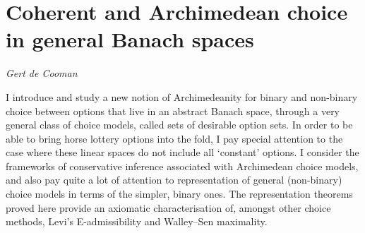 \documentclass[../booklet.tex]{subfiles}
\begin{document}
\section[Coherent and Archimedean choice in general Banach spaces. {\it Gert de Cooman}]{Coherent and Archimedean choice in general Banach spaces}

\begin{center}
  {\it Gert de Cooman}
\end{center}

\vskip 0.8cm


I introduce and study a new notion of Archimedeanity for binary and non-binary choice between options that live in an abstract Banach space, through a very general class of choice models, called sets of desirable option sets.
In order to be able to bring horse lottery options into the fold, I pay special attention to the case where these linear spaces do not include all `constant' options.
I consider the frameworks of conservative inference associated with Archimedean choice models, and also pay quite a lot of attention to representation of general (non-binary) choice models in terms of the simpler, binary ones.
The representation theorems proved here provide an axiomatic characterisation of, amongst other choice methods, Levi's E-admissibility and Walley--Sen maximality.

\end{document}
